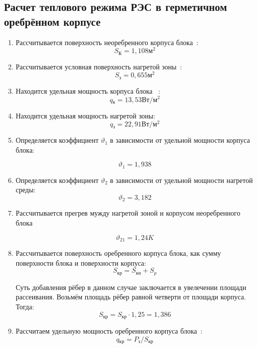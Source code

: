 \subsection{Расчет теплового режима РЭС в герметичном оребрённом
  корпусе}
\begin{enumerate}[label={\arabic*.}]

\item Рассчитывается поверхность неоребренного корпуса
  блока~\cite{Rotkop1976}: %
  $$S\mathrm{_{К}}=1,108\mathrm{м^2}$$

\item Рассчитывается условная поверхность нагретой
  зоны~\cite{Rotkop1976}: %
  $$S\mathrm{_{з}} = 0,655\mathrm{м^2}$$ 

\item Находится удельная мощность корпуса
  блока ~\cite{Rotkop1976}:  %
  $$q\mathrm{_к} = 13,53\mathrm{Вт/м^2}$$

\item Находится удельная мощность нагретой
  зоны: %
  $$q\mathrm{_з} = 22,91 \mathrm{ Вт/м^2}$$

\item Определяется коэффициент $\vartheta_1$ в зависимости от
  удельной мощности корпуса блока:

  $$\vartheta_1=1,938$$
\item Определяется коэффициент $\vartheta_2$ в зависимости от удельной мощности нагретой среды:
  $$\vartheta_2=3,182$$

\item Рассчитывается прегрев мужду нагретой зоной и корпусом
неоребренного блока

$$\vartheta_{21} = 1,24 K$$

\item Рассчитывается поверхность оребренного корпуса блока,
  как сумму поверхности блока и поверхности корпуса:
  \begin{equation}
    S\mathrm{_{кр}} = S\mathrm{_{кн}} + S_{p}
  \end{equation}

Суть добавления рёбер в данном случае заключается в увелечении площади
рассеивания. Возьмём площадь рёбер равной четверти от площади
корпуса. Тогда:
$$S\mathrm{_{кр}} = S\mathrm{_{кр}} \cdot 1,25 = 1,386$$

\item Рассчитаем удельную мощность оребренного
  корпуса блока~\cite{Rotkop1976}:
  \begin{equation}
      q\mathrm{_{кр}} = P\mathrm{_{з}} / S\mathrm{_{кр}}
    \end{equation}
    

\end{enumerate}

